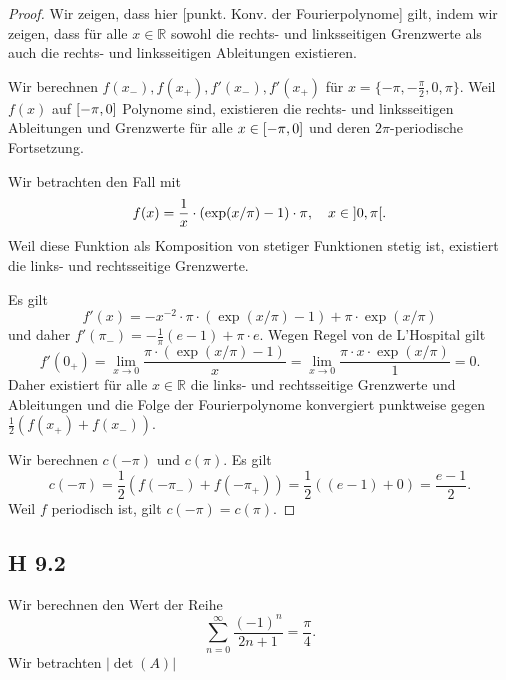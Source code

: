 \documentclass[draft,a5paper]{article}
\providecommand{\abs}[1]{\left\lvert#1\right\rvert}
\theoremstyle{remark}
\begin{document}
\begin{proof}
  Wir zeigen, dass hier [punkt. Konv. der Fourierpolynome] gilt, indem
  wir zeigen, dass für alle \(x \in \mathbb{R}\) sowohl die rechts- und
  linksseitigen Grenzwerte als auch die rechts- und linksseitigen
  Ableitungen existieren.

  Wir berechnen \(f(x_{-}), f(x_{+}), f'(x_{-}), f'(x_{+})\) für
  \(x = \{-\pi, -\frac{\pi}{2}, 0, \pi\}\).  Weil \(f(x)\) auf
  \(\interval{-\pi}{0}\) Polynome sind, existieren die rechts- und
  linksseitigen Ableitungen und Grenzwerte für alle
  \(x \in \interval{-\pi}{0}\) und deren \(2\pi\)-periodische Fortsetzung.

  Wir betrachten den Fall mit
  \[f(x) = \frac{1}{x} \cdot (\exp(x / \pi) - 1) \cdot \pi, \quad x \in
    \ointerval{0}{\pi}.\]  Weil diese Funktion als Komposition von
  stetiger Funktionen stetig ist, existiert die links- und
  rechtsseitige Grenzwerte.

  Es gilt
  \[
    f'(x) = -x^{-2} \cdot \pi \cdot (\exp(x / \pi) - 1) + \pi \cdot \exp(x / \pi)
  \]
  und daher \(f'(\pi_{-})= -\frac{1}{\pi}(e-1) + \pi \cdot e \).  Wegen Regel von de L'Hospital gilt
  \[
    f'(0_{+}) = \lim_{x \to 0} \frac{\pi \cdot (\exp(x / \pi) - 1)}{x} = \lim_{x \to 0}
    \frac{\pi \cdot x \cdot \exp(x/\pi)}{1} = 0.
  \]
  Daher existiert für alle \(x \in \mathbb{R}\) die links- und rechtsseitige
  Grenzwerte und Ableitungen und die Folge der Fourierpolynome
  konvergiert punktweise gegen \(\frac12 (f(x_{+}) + f(x_{-}))\).

  Wir berechnen \(c(-\pi)\) und \(c(\pi)\).  Es gilt
  \[
    c(-\pi) = \frac{1}{2}(f(-\pi_{-}) + f(-\pi_{+})) = \frac12 ((e-1) + 0)
    = \frac{e-1}{2}.
  \]
  Weil \(f\) periodisch ist, gilt \(c(-\pi) = c(\pi)\).
\end{proof}
\subsection{H 9.2}
Wir berechnen den Wert der Reihe
\[\sum_{n=0}^{\infty}\frac{(-1)^{n}}{2n+1} = \frac{\pi}{4}.\]
Wir betrachten \(\abs{\det(A)}\)
\end{document}
